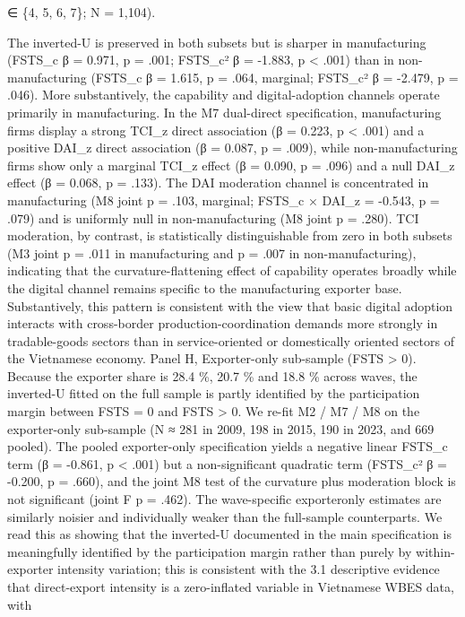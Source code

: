 \documentclass[12pt,a4paper]{article}
\begin{document}
∈ \{4, 5, 6, 7\}; N = 1,104).

The inverted-U is preserved in both subsets but is sharper in
manufacturing (FSTS\_c β = 0.971, p = .001; FSTS\_c² β = -1.883, p
\textless{} .001) than in non-manufacturing (FSTS\_c β = 1.615, p =
.064, marginal; FSTS\_c² β = -2.479, p = .046). More substantively, the
capability and digital-adoption channels operate primarily in
manufacturing. In the M7 dual-direct specification, manufacturing firms
display a strong TCI\_z direct association (β = 0.223, p \textless{}
.001) and a positive DAI\_z direct association (β = 0.087, p = .009),
while non-manufacturing firms show only a marginal TCI\_z effect (β =
0.090, p = .096) and a null DAI\_z effect (β = 0.068, p = .133). The DAI
moderation channel is concentrated in manufacturing (M8 joint p = .103,
marginal; FSTS\_c × DAI\_z = -0.543, p = .079) and is uniformly null in
non-manufacturing (M8 joint p = .280). TCI moderation, by contrast, is
statistically distinguishable from zero in both subsets (M3 joint p =
.011 in manufacturing and p = .007 in non-manufacturing), indicating
that the curvature-flattening effect of capability operates broadly
while the digital channel remains specific to the manufacturing exporter
base. Substantively, this pattern is consistent with the view that basic
digital adoption interacts with cross-border production-coordination
demands more strongly in tradable-goods sectors than in service-oriented
or domestically oriented sectors of the Vietnamese economy. Panel H,
Exporter-only sub-sample (FSTS \textgreater{} 0). Because the exporter
share is 28.4 \%, 20.7 \% and 18.8 \% across waves, the inverted-U
fitted on the full sample is partly identified by the participation
margin between FSTS = 0 and FSTS \textgreater{} 0. We re-fit M2 / M7 /
M8 on the exporter-only sub-sample (N ≈ 281 in 2009, 198 in 2015, 190 in
2023, and 669 pooled). The pooled exporter-only specification yields a
negative linear FSTS\_c term (β = -0.861, p \textless{} .001) but a
non-significant quadratic term (FSTS\_c² β = -0.200, p = .660), and the
joint M8 test of the curvature plus moderation block is not significant
(joint F p = .462). The wave-specific exporteronly estimates are
similarly noisier and individually weaker than the full-sample
counterparts. We read this as showing that the inverted-U documented in
the main specification is meaningfully identified by the participation
margin rather than purely by within-exporter intensity variation; this
is consistent with the 3.1 descriptive evidence that direct-export
intensity is a zero-inflated variable in Vietnamese WBES data, with
\end{document}
